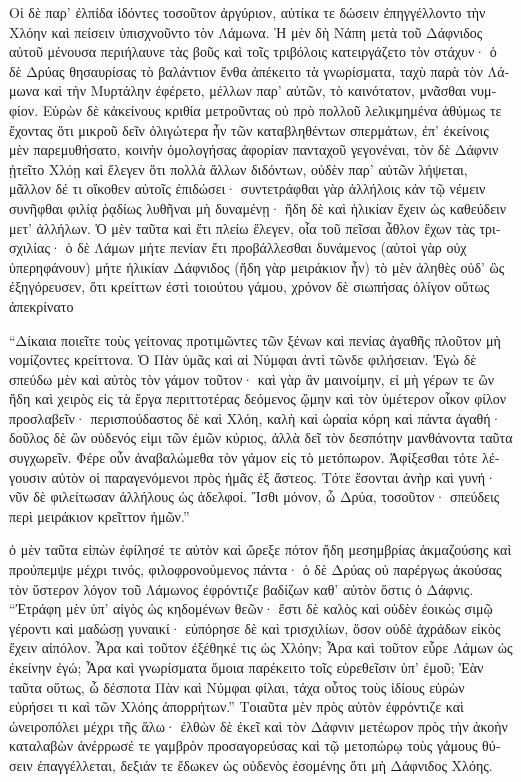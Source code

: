 \documentclass{book}
\begin{document}
\begin{pairs}
\begin{Leftside}
\begin{greek}
  Οἱ δὲ παρ’ ἐλπίδα ἰδόντες τοσοῦτον ἀργύριον, αὐτίκα τε δώσειν ἐπηγγέλλοντο τὴν Χλόην καὶ πείσειν ὑπισχνοῦντο τὸν Λάμωνα.  Ἡ μὲν δὴ Νάπη μετὰ τοῦ Δάφνιδος αὐτοῦ μένουσα περιήλαυνε τὰς βοῦς καὶ τοῖς τριβόλοις κατειργάζετο τὸν στάχυν· ὁ δὲ Δρύας θησαυρίσας τὸ βαλάντιον ἔνθα ἀπέκειτο τὰ γνωρίσματα, ταχὺ παρὰ τὸν Λάμωνα καὶ τὴν Μυρτάλην ἐφέρετο, μέλλων παρ’ αὐτῶν, τὸ καινότατον,  μνᾶσθαι νυμφίον. Εὑρὼν δὲ κἀκείνους κριθία μετροῦντας οὐ πρὸ πολλοῦ λελικμημένα ἀθύμως τε ἔχοντας ὅτι μικροῦ δεῖν ὀλιγώτερα ἦν τῶν καταβληθέντων σπερμάτων, ἐπ’ ἐκείνοις μὲν παρεμυθήσατο,  κοινὴν ὁμολογήσας ἀφορίαν πανταχοῦ γεγονέναι, τὸν δὲ Δάφνιν ᾐτεῖτο Χλόῃ καὶ ἔλεγεν ὅτι πολλὰ ἄλλων διδόντων, οὐδὲν παρ’ αὐτῶν λήψεται, μᾶλλον δέ τι οἴκοθεν αὐτοῖς ἐπιδώσει· συντετράφθαι γὰρ ἀλλήλοις κἀν τῷ νέμειν συνῆφθαι φιλίᾳ ῥᾳδίως λυθῆναι μὴ δυναμένῃ· ἤδη δὲ καὶ ἡλικίαν ἔχειν ὡς καθεύδειν μετ’ ἀλλήλων.  Ὁ μὲν ταῦτα καὶ ἔτι πλείω ἔλεγεν, οἷα τοῦ πεῖσαι ἆθλον ἔχων τὰς τρισχιλίας· ὁ δὲ Λάμων μήτε πενίαν ἔτι προβάλλεσθαι δυνάμενος (αὐτοὶ γὰρ οὐχ ὑπερηφάνουν) μήτε ἡλικίαν Δάφνιδος (ἤδη γὰρ μειράκιον ἦν) τὸ μὲν ἀληθὲς οὐδ’ ὣς ἐξηγόρευσεν, ὅτι κρείττων ἐστὶ τοιούτου γάμου, χρόνον δὲ σιωπήσας ὀλίγον οὕτως ἀπεκρίνατο
\pend


  “Δίκαια ποιεῖτε τοὺς γείτονας προτιμῶντες τῶν ξένων καὶ πενίας ἀγαθῆς πλοῦτον μὴ νομίζοντες κρείττονα. Ὁ Πὰν ὑμᾶς καὶ αἱ Νύμφαι ἀντὶ τῶνδε φιλήσειαν.  Ἐγὼ δὲ σπεύδω μὲν καὶ αὐτὸς τὸν γάμον τοῦτον· καὶ γὰρ ἂν μαινοίμην, εἰ μὴ γέρων τε ὢν ἤδη καὶ χειρὸς εἰς τὰ ἔργα περιττοτέρας δεόμενος ᾤμην καὶ τὸν ὑμέτερον οἶκον φίλον προσλαβεῖν·  περισπούδαστος δὲ καὶ Χλόη, καλὴ καὶ ὡραία κόρη καὶ πάντα ἀγαθή· δοῦλος δὲ ὢν οὐδενός εἰμι τῶν ἐμῶν κύριος, ἀλλὰ δεῖ τὸν δεσπότην μανθάνοντα ταῦτα συγχωρεῖν. Φέρε οὖν ἀναβαλώμεθα τὸν γάμον εἰς τὸ μετόπωρον.  Ἀφίξεσθαι τότε λέγουσιν αὐτὸν οἱ παραγενόμενοι πρὸς ἡμᾶς ἐξ ἄστεος. Τότε ἔσονται ἀνὴρ καὶ γυνή· νῦν δὲ φιλείτωσαν ἀλλήλους ὡς ἀδελφοί. Ἴσθι μόνον, ὦ Δρύα, τοσοῦτον· σπεύδεις περὶ μειράκιον κρεῖττον ἡμῶν.”
\pend


  ὁ μὲν ταῦτα εἰπὼν ἐφίλησέ τε αὐτὸν καὶ ὤρεξε πότον ἤδη μεσημβρίας ἀκμαζούσης καὶ προύπεμψε μέχρι τινός, φιλοφρονούμενος πάντα· ὁ δὲ Δρύας οὐ παρέργως ἀκούσας τὸν ὕστερον λόγον τοῦ Λάμωνος ἐφρόντιζε βαδίζων καθ’ αὑτὸν ὅστις ὁ Δάφνις. “Ἐτράφη μὲν ὑπ’ αἰγὸς ὡς κηδομένων θεῶν· ἔστι δὲ καλὸς καὶ οὐδὲν ἐοικὼς σιμῷ γέροντι καὶ μαδώσῃ γυναικί· εὐπόρησε δὲ καὶ τρισχιλίων, ὅσον οὐδὲ ἀχράδων εἰκὸς ἔχειν αἰπόλον.  Ἆρα καὶ τοῦτον ἐξέθηκέ τις ὡς Χλόην; Ἆρα καὶ τοῦτον εὗρε Λάμων ὡς ἐκείνην ἐγώ; Ἆρα καὶ γνωρίσματα ὅμοια παρέκειτο τοῖς εὑρεθεῖσιν ὑπ’ ἐμοῦ; Ἐὰν ταῦτα οὕτως, ὦ δέσποτα Πὰν καὶ Νύμφαι φίλαι, τάχα οὗτος τοὺς ἰδίους εὑρὼν εὑρήσει τι καὶ τῶν Χλόης ἀπορρήτων.”  Τοιαῦτα μὲν πρὸς αὑτὸν ἐφρόντιζε καὶ ὠνειροπόλει μέχρι τῆς ἅλω· ἐλθὼν δὲ ἐκεῖ καὶ τὸν Δάφνιν μετέωρον πρὸς τὴν ἀκοὴν καταλαβὼν ἀνέρρωσέ τε γαμβρὸν προσαγορεύσας καὶ τῷ μετοπώρῳ τοὺς γάμους θύσειν ἐπαγγέλλεται, δεξιάν τε ἔδωκεν ὡς οὐδενὸς ἐσομένης ὅτι μὴ Δάφνιδος Χλόης.
\pend



\end{greek}
\end{Leftside}
\end{pairs}
\end{document}
